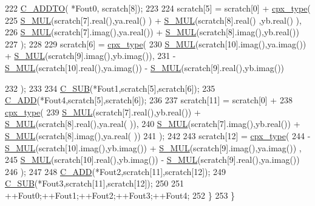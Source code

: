 \begin{DoxyCode}
222                 \hyperlink{classkissfft_a1cb327491bc3dce979631f5c2ebd142a}{C\_ADDTO}( *Fout0, scratch[8]);
223 
224                 scratch[5] = scratch[0] + \hyperlink{classkissfft_af66664488b0b1b2995f3e4c2f63a8b7d}{cpx\_type}(
225                         \hyperlink{classkissfft_a118797ba0c80bcd14ed5792deeb22c58}{S\_MUL}(scratch[7].real(),ya.real() ) + \hyperlink{classkissfft_a118797ba0c80bcd14ed5792deeb22c58}{S\_MUL}(scratch[8].real() ,yb.real() 
      ),
226                         \hyperlink{classkissfft_a118797ba0c80bcd14ed5792deeb22c58}{S\_MUL}(scratch[7].imag(),ya.real()) + \hyperlink{classkissfft_a118797ba0c80bcd14ed5792deeb22c58}{S\_MUL}(scratch[8].imag(),yb.real())
227                         );
228 
229                 scratch[6] =  \hyperlink{classkissfft_af66664488b0b1b2995f3e4c2f63a8b7d}{cpx\_type}( 
230                         \hyperlink{classkissfft_a118797ba0c80bcd14ed5792deeb22c58}{S\_MUL}(scratch[10].imag(),ya.imag()) + \hyperlink{classkissfft_a118797ba0c80bcd14ed5792deeb22c58}{S\_MUL}(scratch[9].imag(),yb.imag()),
231                         -\hyperlink{classkissfft_a118797ba0c80bcd14ed5792deeb22c58}{S\_MUL}(scratch[10].real(),ya.imag()) - \hyperlink{classkissfft_a118797ba0c80bcd14ed5792deeb22c58}{S\_MUL}(scratch[9].real(),yb.imag())
       
232                         );
233 
234                 \hyperlink{classkissfft_a1f4a4ec1b1ac1f2b199710b921b53a6d}{C\_SUB}(*Fout1,scratch[5],scratch[6]);
235                 \hyperlink{classkissfft_a4f053d9dbac7e4c7c8594b01eca50511}{C\_ADD}(*Fout4,scratch[5],scratch[6]);
236 
237                 scratch[11] = scratch[0] + 
238                     \hyperlink{classkissfft_af66664488b0b1b2995f3e4c2f63a8b7d}{cpx\_type}(
239                             \hyperlink{classkissfft_a118797ba0c80bcd14ed5792deeb22c58}{S\_MUL}(scratch[7].real(),yb.real()) + \hyperlink{classkissfft_a118797ba0c80bcd14ed5792deeb22c58}{S\_MUL}(scratch[8].real(),ya.real(
      )),
240                             \hyperlink{classkissfft_a118797ba0c80bcd14ed5792deeb22c58}{S\_MUL}(scratch[7].imag(),yb.real()) + \hyperlink{classkissfft_a118797ba0c80bcd14ed5792deeb22c58}{S\_MUL}(scratch[8].imag(),ya.real(
      ))
241                             );
242 
243                 scratch[12] = \hyperlink{classkissfft_af66664488b0b1b2995f3e4c2f63a8b7d}{cpx\_type}(
244                         -\hyperlink{classkissfft_a118797ba0c80bcd14ed5792deeb22c58}{S\_MUL}(scratch[10].imag(),yb.imag()) + \hyperlink{classkissfft_a118797ba0c80bcd14ed5792deeb22c58}{S\_MUL}(scratch[9].imag(),ya.imag())
      ,
245                         \hyperlink{classkissfft_a118797ba0c80bcd14ed5792deeb22c58}{S\_MUL}(scratch[10].real(),yb.imag()) - \hyperlink{classkissfft_a118797ba0c80bcd14ed5792deeb22c58}{S\_MUL}(scratch[9].real(),ya.imag())
246                         );
247 
248                 \hyperlink{classkissfft_a4f053d9dbac7e4c7c8594b01eca50511}{C\_ADD}(*Fout2,scratch[11],scratch[12]);
249                 \hyperlink{classkissfft_a1f4a4ec1b1ac1f2b199710b921b53a6d}{C\_SUB}(*Fout3,scratch[11],scratch[12]);
250 
251                 ++Fout0;++Fout1;++Fout2;++Fout3;++Fout4;
252             \}
253         \}
\end{DoxyCode}
